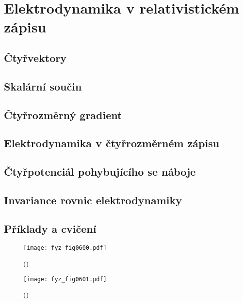 \setchaptertoc
\chapter{Elektrodynamika v relativistickém zápisu}\label{fyz:IIchapXXV}

  \section{Čtyřvektory}\label{fyz:IIchapXXVsecI}
  \section{Skalární součin}\label{fyz:IIchapXXVsecII}
  \section{Čtyřrozměrný gradient}\label{fyz:IIchapXXVsecIII}
  \section{Elektrodynamika v čtyřrozměrném zápisu}\label{fyz:IIchapXXVsecIV}
  \section{Čtyřpotenciál pohybujícího se náboje}\label{fyz:IIchapXXVsecV}
  \section{Invariance rovnic elektrodynamiky}\label{fyz:IIchapXXVsecVI}
  \section{Příklady a cvičení}\label{fyz:IIchapXXVsecVII}

    \begin{figure}[ht!] %
      \centering
      \texttt{[image: fyz\_fig0600.pdf]}
      \caption{
               (\cite[s.~707]{Feynman02})}
      \label{fyz:fig0600}
    \end{figure}


    \begin{figure}[ht!] %
      \centering
      \texttt{[image: fyz\_fig0601.pdf]}
      \caption{
               (\cite[s.~707]{Feynman02})}
      \label{fyz:fig0601}
    \end{figure}
    
